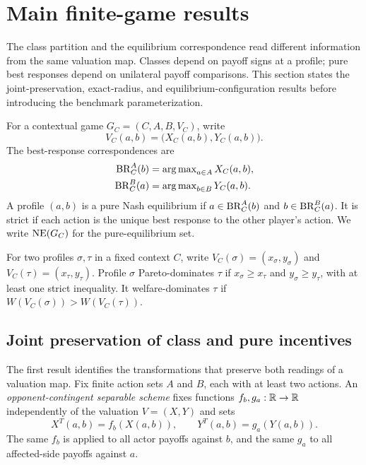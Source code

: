 \section{Main finite-game results}
\label{sec:finite-results}

The class partition and the equilibrium correspondence read different information from the same valuation map. Classes depend on payoff signs at a profile; pure best responses depend on unilateral payoff comparisons. This section states the joint-preservation, exact-radius, and equilibrium-configuration results before introducing the benchmark parameterization.

For a contextual game $G_C=(C,A,B,V_C)$, write
\[
V_C(a,b)=\bigl(X_C(a,b),Y_C(a,b)\bigr).
\]
The best-response correspondences are
\begin{align*}
\operatorname{BR}^A_C(b)&=\operatorname{arg\,max}_{a\in A}X_C(a,b),\\
\operatorname{BR}^B_C(a)&=\operatorname{arg\,max}_{b\in B}Y_C(a,b).
\end{align*}
A profile $(a,b)$ is a pure Nash equilibrium if $a\in\operatorname{BR}^A_C(b)$ and $b\in\operatorname{BR}^B_C(a)$. It is strict if each action is the unique best response to the other player's action. We write $\operatorname{NE}(G_C)$ for the pure-equilibrium set.

\begin{definition}
For two profiles $\sigma,\tau$ in a fixed context $C$, write $V_C(\sigma)=(x_\sigma,y_\sigma)$ and $V_C(\tau)=(x_\tau,y_\tau)$. Profile $\sigma$ Pareto-dominates $\tau$ if $x_\sigma\ge x_\tau$ and $y_\sigma\ge y_\tau$, with at least one strict inequality. It welfare-dominates $\tau$ if $W(V_C(\sigma))>W(V_C(\tau))$.
\end{definition}

\subsection{Joint preservation of class and pure incentives}

The first result identifies the transformations that preserve both readings of a
valuation map. Fix finite action sets $A$ and $B$, each with at least two
actions. An \emph{opponent-contingent separable scheme} fixes functions
$f_b,g_a:\mathbb{R}\to\mathbb{R}$ independently of the valuation $V=(X,Y)$ and sets
\begin{equation}
\label{eq:separable-scheme}
X^T(a,b)=f_b(X(a,b)),
\qquad
Y^T(a,b)=g_a(Y(a,b)).
\end{equation}
The same $f_b$ is applied to all actor payoffs against $b$, and the same $g_a$
to all affected-side payoffs against $a$.

